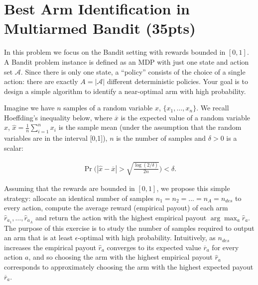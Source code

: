\documentclass{article}
\begin{document}
\section{Best Arm Identification in Multiarmed Bandit (35pts)}
In this problem we focus on the Bandit setting with rewards bounded in $[0,1]$. A Bandit problem instance is defined as an MDP with just one state and action set $\mathcal A$. Since there is only one state, a ``policy'' consists of the choice of a single action: there are exactly $A = |\mathcal A|$ different deterministic policies. Your goal is to design a simple algorithm to identify a near-optimal arm with high probability.

Imagine we have $n$ samples of a random variable $x$, $\{x_1, \dots, x_n\}$. We recall Hoeffding's inequality below, where $\overline x$ is the expected value of a random variable $x$, $\widehat x= \frac{1}{n} \sum_{i=1}^n x_i$ is the sample mean (under the assumption that the random variables are in the interval [0,1]), $n$ is the number of samples  and $\delta >0$ is a scalar:

\begin{align*}
\Pr\Bigg(|\widehat x - \overline x | > \sqrt{\frac{\log(2/\delta)}{2n}}	\Bigg) < \delta.
\end{align*}

Assuming that the rewards are bounded in $[0,1]$,
we propose this simple strategy: allocate an identical number of samples $n_1 = n_2=...=n_{A} = n_{des}$ to every action, compute the average reward (empirical payout) of each arm $\widehat r_{a_1}, \dots, \widehat r_{a_A}$ and return the action with the highest empirical payout $\arg\max_a \widehat r_{a}$. The purpose of this exercise is to study the number of samples required to output an arm that is at least $\epsilon$-optimal with high probability.
Intuitively, as $n_{des}$ increases the empirical payout $\widehat r_a$ converges to its expected value $\overline r_a$ for every action $a$, and so choosing the arm with the highest empirical payout $\widehat r_a$ corresponds to approximately choosing the arm with the highest expected payout $\overline r_a$.
\end{document}
